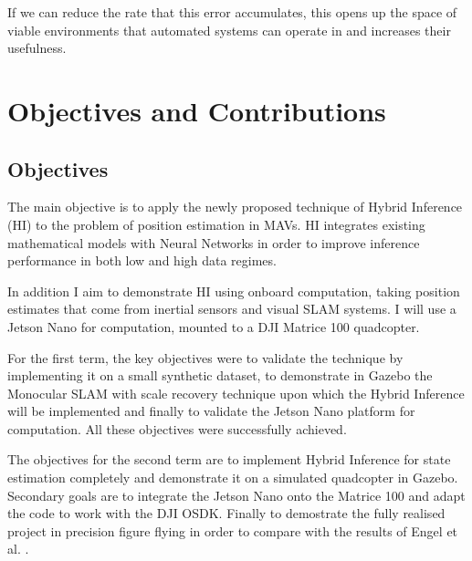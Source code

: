 \documentclass[]{../resources/final_report}
\begin{document}
If we can reduce the rate that this error accumulates, this opens up the space of viable environments
that automated systems can operate in and increases their usefulness.


\section{Objectives and Contributions}

\subsection{Objectives}
The main objective is to apply the newly proposed technique of Hybrid Inference (HI)
\cite{HybridInference} to the problem of position estimation in MAVs. HI integrates 
existing mathematical models with Neural Networks in order to improve inference performance in 
both low and high data regimes.

In addition I aim to demonstrate HI using onboard computation, taking position estimates that 
come from inertial sensors and visual SLAM systems. I will use a Jetson Nano for computation, 
mounted to a DJI Matrice 100 quadcopter.

For the first term, the key objectives were to validate the technique by implementing it on a 
small synthetic dataset, to demonstrate in Gazebo the Monocular SLAM with scale recovery technique 
\cite{Engel:Camera-basedNav} upon which the Hybrid Inference will be implemented and finally to 
validate the Jetson Nano platform for computation. All these objectives were successfully achieved.

The objectives for the second term are to implement Hybrid Inference for state estimation completely 
and demonstrate it on a simulated quadcopter in Gazebo. Secondary goals are to integrate the 
Jetson Nano onto the Matrice 100 and adapt the code to work with the DJI OSDK. Finally to demostrate 
the fully realised project in precision figure flying in order to compare with the results of 
Engel et al. \cite{Engel:FigureFlying}.

\end{document}
